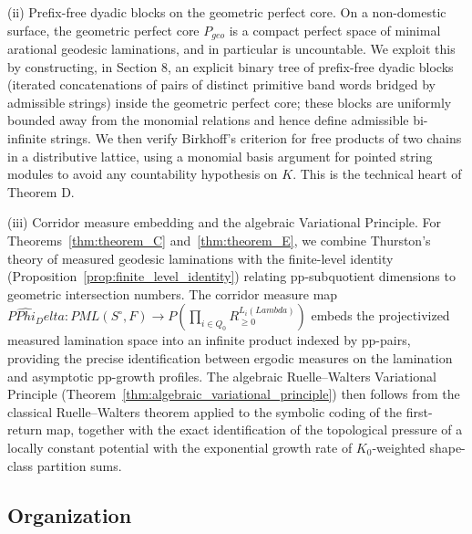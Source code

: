 \documentclass[11pt,a4paper,reqno]{amsart}
\def\mathcal#1{#1}%
\def\mathbb#1{#1}%
\def\mathrm#1{#1}%
\def\K{K}%
\def\forb{F}%
\def\hookrightarrow{\to}%
\def\Phi{Phi}%
\def\Delta{Delta}%
\def\Lambda{Lambda}%
\def\textbf#1{#1}%
\theoremstyle{definition}
\theoremstyle{remark}
\newcommand{\K}{\mathbb{K}}
\newcommand{\R}{\mathbb{R}}
\newcommand{\forb}{\mathfrak{F}}
\begin{document}
\smallskip
\noindent\textbf{(ii) Prefix-free dyadic blocks on the geometric perfect core.} On a non-domestic surface, the geometric perfect core $\mathcal{P}_{\mathrm{geo}}$ is a compact perfect space of minimal arational geodesic laminations, and in particular is uncountable. We exploit this by constructing, in Section 8, an explicit binary tree of prefix-free dyadic blocks (iterated concatenations of pairs of distinct primitive band words bridged by admissible strings) inside the geometric perfect core; these blocks are uniformly bounded away from the monomial relations and hence define admissible bi-infinite strings. We then verify Birkhoff's criterion for free products of two chains in a distributive lattice, using a monomial basis argument for pointed string modules to avoid any countability hypothesis on $\K$. This is the technical heart of Theorem D.

\smallskip
\noindent\textbf{(iii) Corridor measure embedding and the algebraic Variational Principle.} For Theorems~\ref{thm:theorem_C} and~\ref{thm:theorem_E}, we combine Thurston's theory of measured geodesic laminations \cite{Thurston1988, CassonBleiler1988} with the finite-level identity (Proposition~\ref{prop:finite_level_identity}) relating pp-subquotient dimensions to geometric intersection numbers. The corridor measure map $\mathbb{P}\widehat{\Phi}_\Delta \colon \mathcal{PML}(\mathcal{S}^\circ, \forb) \hookrightarrow \mathbb{P}(\prod_{i \in Q_0} \R_{\ge 0}^{\mathcal{L}_i(\Lambda)})$ embeds the projectivized measured lamination space into an infinite product indexed by pp-pairs, providing the precise identification between ergodic measures on the lamination and asymptotic pp-growth profiles. The algebraic Ruelle--Walters Variational Principle (Theorem~\ref{thm:algebraic_variational_principle}) then follows from the classical Ruelle--Walters theorem applied to the symbolic coding of the first-return map, together with the exact identification of the topological pressure of a locally constant potential with the exponential growth rate of $K_0$-weighted shape-class partition sums.

\subsection{Organization}
\label{subsec:organization}
\end{document}
